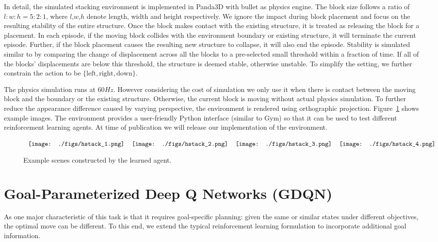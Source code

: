\documentclass{article} %
\begin{document}
In detail, the simulated stacking environment is implemented in Panda3D \citep{goslin2004panda3d} with bullet \citep{coumans2010bullet} as physics engine. 
The block size follows a ratio of $l:w:h = 5:2:1$, where $l$,$w$,$h$ denote length, width and height respectively. We ignore the impact during block placement and focus on the resulting stability of the entire structure. Once the block makes contact with the existing structure, it is treated as releasing the block for a placement. In each episode, if the moving block collides with the environment boundary or existing structure, it will terminate the current episode. Further, if the block placement causes the resulting new structure to collapse, it will also end the episode. Stability is simulated similar to \cite{li2017visual} by comparing the change of displacement across all the blocks to a pre-selected small threshold within a fraction of time. If all of the blocks' displacements are below this threshold, the structure is deemed stable, otherwise unstable. To simplify the setting, we further constrain the action to be $\{\text{left},\text{right},\text{down}\}$.

The physics simulation runs at $60Hz$. However considering the cost of simulation we only use it when there is contact between the moving block and the boundary or the existing structure. Otherwise, the current block is moving without actual physics simulation. To further reduce the appearance difference caused by varying perspective, the environment is rendered using orthographic projection. Figure~\ref{fig:scene_sample} shows example images. The environment provides a user-friendly Python interface (similar to  Gym\citep{brockman2016openai}) so that it can be used to test different reinforcement learning agents. At time of publication we will release our implementation of the environment.

\begin{figure}
\begin{center}$
\begin{tabular}{cccc}
\label{fig:hstack1}\texttt{[image: ./figs/hstack\_1.png]}&
\label{fig:hstack2}\texttt{[image: ./figs/hstack\_2.png]}&
\label{fig:hstack3}\texttt{[image: ./figs/hstack\_3.png]}&
\label{fig:hstack4}\texttt{[image: ./figs/hstack\_4.png]}\\
\end{tabular}$
\end{center}
\caption{Example scenes constructed by the learned agent.}
\label{fig:scene_sample}
\end{figure}\section{Goal-Parameterized Deep Q Networks (GDQN)}
As one major characteristic of this task is that it requires goal-specific planning: given the same or similar states under different objectives, the optimal move can be different. To this end, we extend the typical reinforcement learning formulation to incorporate additional goal information.  
\end{document}

